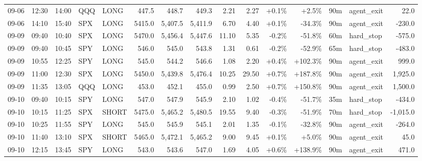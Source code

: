 \documentclass[11pt,a4paper,twoside]{article}
\begin{document}
\begin{landscape}
\begin{center}
\begin{longtable}{>{\color{txtmain}}l l l l l r r r r r r r r >{\color{txtmain}}l r}
09-06 & 12:30 & 14:00 & QQQ & LONG & 447.5 & 448.7 & 449.3 & 2.21 & 2.27 & \textcolor{wingreen}{+0.1\%} & \textcolor{wingreen}{+2.5\%} & 90m & agent\_exit & \textcolor{wingreen}{22.0} \\
09-06 & 14:10 & 15:40 & SPX & LONG & 5415.0 & 5,407.5 & 5,411.9 & 6.70 & 4.40 & \textcolor{wingreen}{+0.1\%} & \textcolor{lossred}{-34.3\%} & 90m & agent\_exit & \textcolor{lossred}{-230.0} \\
09-09 & 09:40 & 10:40 & SPX & LONG & 5470.0 & 5,456.4 & 5,447.6 & 11.10 & 5.35 & \textcolor{lossred}{-0.2\%} & \textcolor{lossred}{-51.8\%} & 60m & hard\_stop & \textcolor{lossred}{-575.0} \\
09-09 & 09:40 & 10:45 & SPY & LONG & 546.0 & 545.0 & 543.8 & 1.31 & 0.61 & \textcolor{lossred}{-0.2\%} & \textcolor{lossred}{-52.9\%} & 65m & hard\_stop & \textcolor{lossred}{-483.0} \\
09-09 & 10:55 & 12:25 & SPY & LONG & 545.0 & 544.2 & 546.6 & 1.08 & 2.20 & \textcolor{wingreen}{+0.4\%} & \textcolor{wingreen}{+102.3\%} & 90m & agent\_exit & \textcolor{wingreen}{999.0} \\
09-09 & 11:00 & 12:30 & SPX & LONG & 5450.0 & 5,439.8 & 5,476.4 & 10.25 & 29.50 & \textcolor{wingreen}{+0.7\%} & \textcolor{wingreen}{+187.8\%} & 90m & agent\_exit & \textcolor{wingreen}{1,925.0} \\
09-09 & 11:35 & 13:05 & QQQ & LONG & 453.0 & 452.1 & 455.0 & 0.99 & 2.50 & \textcolor{wingreen}{+0.7\%} & \textcolor{wingreen}{+150.8\%} & 90m & agent\_exit & \textcolor{wingreen}{1,500.0} \\
09-10 & 09:40 & 10:15 & SPY & LONG & 547.0 & 547.9 & 545.9 & 2.10 & 1.02 & \textcolor{lossred}{-0.4\%} & \textcolor{lossred}{-51.7\%} & 35m & hard\_stop & \textcolor{lossred}{-434.0} \\
09-10 & 10:15 & 11:25 & SPX & SHORT & 5475.0 & 5,465.2 & 5,480.5 & 19.55 & 9.40 & \textcolor{lossred}{-0.3\%} & \textcolor{lossred}{-51.9\%} & 70m & hard\_stop & \textcolor{lossred}{-1,015.0} \\
09-10 & 10:25 & 11:55 & SPY & LONG & 545.0 & 545.9 & 545.1 & 2.01 & 1.35 & \textcolor{lossred}{-0.1\%} & \textcolor{lossred}{-32.8\%} & 90m & agent\_exit & \textcolor{lossred}{-264.0} \\
09-10 & 11:40 & 13:10 & SPX & SHORT & 5465.0 & 5,472.1 & 5,465.2 & 9.00 & 9.45 & \textcolor{wingreen}{+0.1\%} & \textcolor{wingreen}{+5.0\%} & 90m & agent\_exit & \textcolor{wingreen}{45.0} \\
09-10 & 12:15 & 13:45 & SPY & LONG & 543.0 & 543.6 & 547.0 & 1.69 & 4.05 & \textcolor{wingreen}{+0.6\%} & \textcolor{wingreen}{+138.9\%} & 90m & agent\_exit & \textcolor{wingreen}{471.0} \\

\end{longtable}
\end{center}
\end{landscape}
\end{document}
